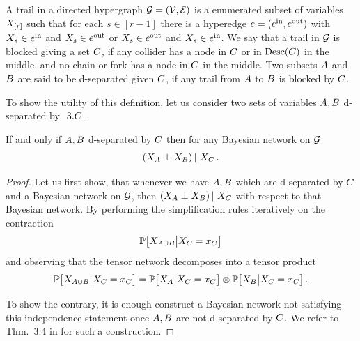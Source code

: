 \begin{definition}
    A trail in a directed hypergraph $\mathcal{G}=(\mathcal{V},\mathcal{E})$ is a enumerated subset of variables $X_{[r]}$ such that for each $s\in[r-1]$ there is a hyperedge $e=(e^{\mathrm{in}},e^{\mathrm{out}})$ with $X_{s}\in e^{\mathrm{in}}$ and $X_{s}\in e^{\mathrm{out}}$ or $X_{s}\in e^{\mathrm{out}}$ and $X_{s}\in e^{\mathrm{in}}$.
    We say that a trail in $\mathcal{G}$ is blocked giving a set $C$, if any collider has a node in $C$ or in $\mathrm{Desc}(C)$ in the middle, and no chain or fork has a node in $C$ in the middle.
    Two subsets $A$ and $B$ are said to be d-separated given $C$, if any trail from $A$ to $B$ is blocked by $C$.
\end{definition}

To show the utility of this definition, let us consider two sets of variables $A,B$ d-separated by $~3.C$.

\begin{theorem}\label{the:dSeparation}
    If and only if $A,B$ d-separated by $C$ then for any Bayesian network on $\mathcal{G}$
    \begin{align*}
        \left(X_{A}\perp X_{B}\middle)\,\right|\,X_{C} \, .
    \end{align*}
\end{theorem}
\begin{proof}
    Let us first show, that whenever we have $A,B$ which are d-separated by $C$ and a Bayesian network on $\mathcal{G}$, then $\left(X_{A}\perp X_{B}\middle)\,\right|\,X_{C}$ with respect to that Bayesian network.
    By performing the simplification rules iteratively on the contraction
    \begin{align*}
        \mathbb{P}\big[X_{A\cup B}\big|X_{C}=x_{C}\big]
    \end{align*}
    and observing that the tensor network decomposes into a tensor product
    \begin{align*}
        \mathbb{P}\big[X_{A\cup B}\big|X_{C}=x_{C}\big]
        = \mathbb{P}\big[X_{A}\big|X_{C}=x_{C}\big]
        \otimes \mathbb{P}\big[X_{B}\big|X_{C}=x_{C}\big] \, .
    \end{align*}

    To show the contrary, it is enough construct a Bayesian network not satisfying this independence statement once $A,B$ are not d-separated by $C$.
    We refer to Thm.~3.4 in \cite{koller_probabilistic_2009} for such a construction.
\end{proof}

